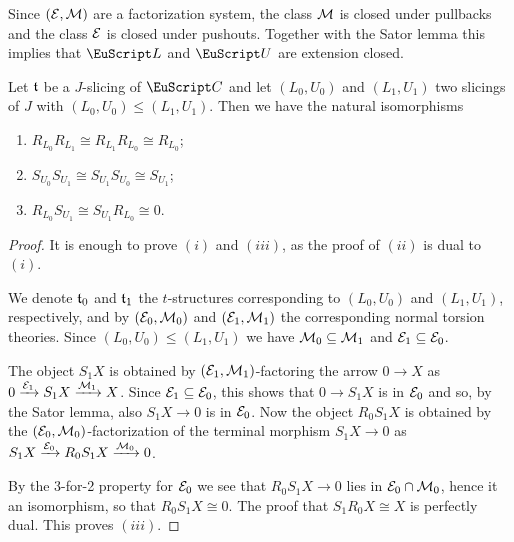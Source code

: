 \begin{remark}\label{closed.by.extensions} Since $(\mathcal{E},\mathcal{M})$ are a factorization system, the class $\mathcal{M}$ is closed under pullbacks and the class $\mathcal{E}$ is closed under pushouts. Together with the Sator lemma this implies that  $\cate{L}$ and $\cate{U}$ are extension closed. 


\begin{lemma}
\label{lem.iterated} 
Let $\mathfrak{t}$ be a $J$-slicing of $\C$ and let $(L_0,U_0)$ and $(L_1,U_1)$ two slicings of $J$ with $(L_0,U_0)\leq (L_1,U_1)$. Then we have the natural isomorphisms
\begin{enumerate}[label=$\roman*$)]
\item $R_{L_0}R_{L_1}\cong R_{L_1}R_{L_0}\cong R_{L_0}$;
\item $ S_{U_0}S_{U_1}\cong S_{U_1}S_{U_0}\cong S_{U_1}$;
\item $R_{L_0}S_{U_1}\cong S_{U_1}R_{L_0}\cong 0$.
\end{enumerate}
\end{lemma}
\begin{proof} 
It is enough to prove $(i)$ and $(iii)$, as the proof of $(ii)$ is dual to $(i)$.

We denote $\mathfrak{t}_0$ and $\mathfrak{t}_1$ the $t$-structures corresponding to $(L_0,U_0)$ and $(L_1,U_1)$, respectively, and by $(\mathcal{E}_0,\mathcal{M}_0)$ and $(\mathcal{E}_1,\mathcal{M}_1)$ the corresponding normal torsion theories. Since $(L_0,U_0)\leq (L_1,U_1)$ we have $\mathcal{M}_{0} \subseteq \mathcal{M}_{1}$ and $\mathcal{E}_1\subseteq \mathcal{E}_0$.

The object $S_1X$ is obtained by $(\mathcal{E}_1, \mathcal{M}_1)$-factoring the arrow $0\to X$ as $0\xrightarrow{\mathcal{E}_1}S_1X\xrightarrow{\mathcal{M}_1}X$. Since $\mathcal{E}_1\subseteq\mathcal{E}_0$, this shows that $0\to S_1X$ is in $\mathcal{E}_0$ and so, by the Sator lemma, also $S_1X\to 0$ is in $\mathcal{E}_0$. Now the object $R_0S_1X$ is obtained by the $(\mathcal{E}_0, \mathcal{M}_0)$-factorization of the terminal morphism $S_1X\to 0$ as $S_1X\xrightarrow{\mathcal{E}_0}R_0S_1X\xrightarrow{\mathcal{M}_0}0$.

By the 3-for-2 property for $\mathcal{E}_0$ we see that $R_0S_1X \to 0$ lies in $\mathcal{E}_{0}\cap \mathcal{M}_{0}$, hence it an isomorphism, so that $R_0S_1 X\cong 0$. The proof that $S_1R_0X\cong X$ is perfectly dual. This proves $(iii)$.


\end{proof}
\end{remark}
